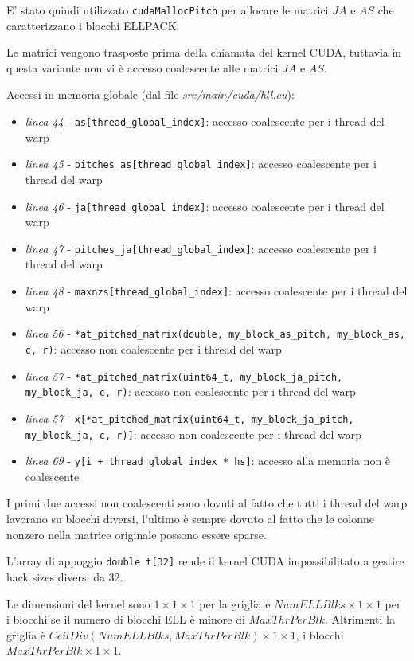 \documentclass[a4paper,9pt]{extarticle}
\begin{document}
E' stato quindi utilizzato \texttt{cudaMallocPitch} per allocare le matrici $JA$ e $AS$ che
caratterizzano i blocchi ELLPACK.

Le matrici vengono trasposte prima della chiamata del kernel CUDA, tuttavia in questa variante non
vi è accesso coalescente alle matrici $JA$ e $AS$.

Accessi in memoria globale (dal file \textit{src/main/cuda/hll.cu}):
\begin{itemize}
	\item \textit{linea 44} - \texttt{as[thread\_global\_index]}: accesso coalescente per i thread del warp
	\item \textit{linea 45} - \texttt{pitches\_as[thread\_global\_index]}: accesso coalescente per i thread del warp
	\item \textit{linea 46} - \texttt{ja[thread\_global\_index]}: accesso coalescente per i thread del warp
	\item \textit{linea 47} - \texttt{pitches\_ja[thread\_global\_index]}: accesso coalescente per i thread del warp
	\item \textit{linea 48} - \texttt{maxnzs[thread\_global\_index]}: accesso coalescente per i thread del warp
	\item \textit{linea 56} - \texttt{*at\_pitched\_matrix(double, my\_block\_as\_pitch, my\_block\_as, c, r)}: accesso non coalescente per i 
	thread del warp
	\item \textit{linea 57} - \texttt{*at\_pitched\_matrix(uint64\_t, my\_block\_ja\_pitch,\\ my\_block\_ja, c, r)}: accesso non coalescente per 
	i thread del warp
	\item \textit{linea 57} - \texttt{x[*at\_pitched\_matrix(uint64\_t, my\_block\_ja\_pitch,\\ my\_block\_ja, c, r)]}: accesso non coalescente per i thread del warp
	\item \textit{linea 69} - \texttt{y[i + thread\_global\_index * hs]}: accesso alla
	memoria non è coalescente
\end{itemize}

I primi due accessi non coalescenti sono dovuti al fatto che tutti i thread del warp lavorano su blocchi diversi,
l'ultimo è sempre dovuto al fatto che le colonne nonzero nella matrice originale possono essere sparse.

L'array di appoggio \texttt{double t[32]} rende il kernel CUDA impossibilitato a gestire hack 
sizes diversi da 32.

Le dimensioni del kernel sono $1 \times 1 \times 1$ per la griglia e $NumELLBlks \times 1 \times 
1$ per i blocchi se il numero di blocchi ELL è minore di $MaxThrPerBlk$. Altrimenti la griglia è 
$CeilDiv(NumELLBlks, MaxThrPerBlk) \times 1 \times 1$, i blocchi $MaxThrPerBlk \times 1 \times 1$. 
\end{document}
